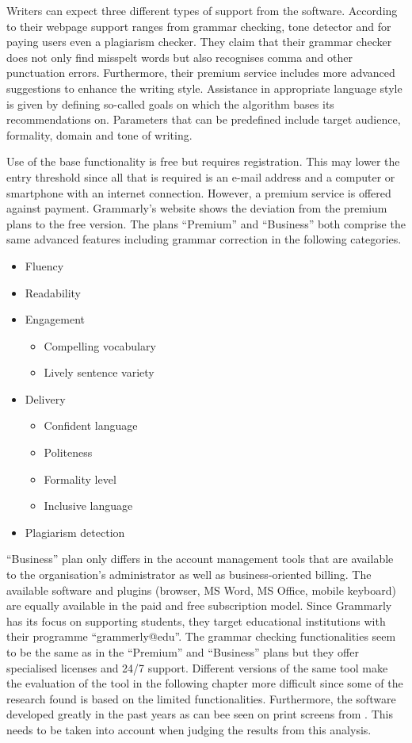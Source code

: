 \documentclass[runningheads]{llncs}
\let\OldTextregistered\textregistered
\renewcommand{\textregistered}{\OldTextregistered\xspace}%
\begin{document}
Writers can expect three different types of support from the software. According to their webpage \parencite{noauthor_write_nodate} support ranges from grammar checking, tone detector and for paying users even a plagiarism checker. They claim that their grammar checker does not only find misspelt words but also recognises comma and other punctuation errors. Furthermore, their premium service includes more advanced suggestions to enhance the writing style. Assistance in appropriate language style is given by defining so-called goals on which the algorithm bases its recommendations on. Parameters that can be predefined include target audience, formality, domain and tone of writing.   

Use of the base functionality is free but requires registration. This may lower the entry threshold since all that is required is an e-mail address and a computer or smartphone with an internet connection. However, a premium service is offered against payment. Grammarly\textregistered's website \citep{noauthor_write_nodate} shows the deviation from the premium plans to the free version. The plans ``Premium'' and ``Business'' both comprise the same advanced features including grammar correction in the following categories.
\begin{itemize}
 \item Fluency
 \item Readability
 \item Engagement
 \begin{itemize}
  \item Compelling vocabulary
  \item Lively sentence variety
 \end{itemize}
 \item Delivery
 \begin{itemize}
  \item Confident language
  \item Politeness
  \item Formality level
  \item Inclusive language
 \end{itemize}
 \item Plagiarism detection
\end{itemize}
``Business'' plan only differs in the account management tools that are available to the organisation's administrator as well as business-oriented billing. The available software and plugins (browser, MS Word, MS Office, mobile keyboard) are equally available in the paid and free subscription model. Since Grammarly\textregistered has its focus on supporting students, they target educational institutions with their programme ``grammerly@edu''. The grammar checking functionalities seem to be the same as in the ``Premium'' and ``Business'' plans but they offer specialised licenses and 24/7 support. Different versions of the same tool make the evaluation of the tool in the following chapter more difficult since some of the research found is based on the limited functionalities. Furthermore, the software developed greatly in the past years as can bee seen on print screens from \textcite{dembsey_closing_2017}. This needs to be taken into account when judging the results from this analysis.
\end{document}
